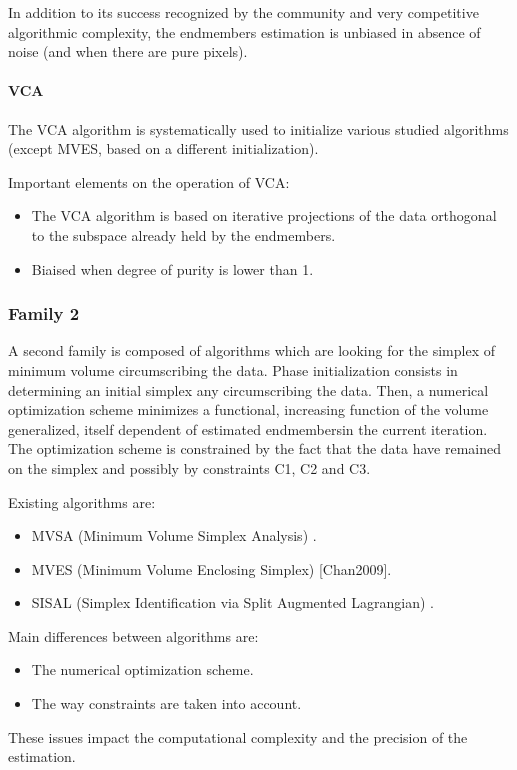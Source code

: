 In addition to its success recognized by the
community and very competitive algorithmic complexity, the endmembers estimation is unbiased in absence of noise (and when there are pure pixels).

\paragraph{VCA} 
The VCA algorithm is systematically
used to initialize various studied algorithms (except
MVES, based on a different initialization).

Important elements on the operation of VCA:
\begin{itemize}
\item {The VCA algorithm
is based on iterative projections of the data orthogonal to
the subspace already held by the endmembers.}
\item {Biaised when degree of purity is lower than 1.}
\end{itemize}  

\subsubsection{Family 2} 
A second family is composed of algorithms which are looking for the simplex of minimum
volume circumscribing the data. Phase initialization consists in determining
an initial simplex any circumscribing the data. Then, a numerical
optimization scheme minimizes a functional, increasing function of the
volume generalized, itself dependent of estimated endmembersin the
current iteration. The optimization scheme is constrained by the fact that the
data have remained on the simplex and possibly by constraints C1, C2 and C3.

Existing algorithms are: 
\begin{itemize}
\item {MVSA (Minimum Volume Simplex
Analysis) \cite{Li2008}.}
\item { MVES (Minimum Volume Enclosing Simplex)
[Chan2009].}
\item {SISAL (Simplex Identification via Split Augmented
Lagrangian) \cite{Dias2009}.}
\end{itemize}  
  
Main differences between algorithms are: 
\begin{itemize}
\item {The numerical optimization scheme.}
\item {The way
constraints are taken into account.}

\end{itemize}  
These issues impact the computational complexity and the precision of the estimation.
 
